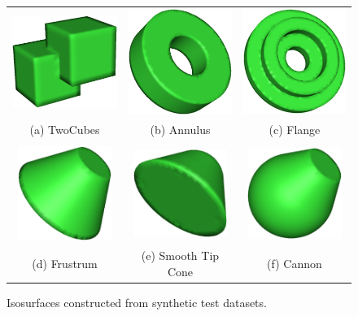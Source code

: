 \begin{figure}
\centering
\begin{tabular}{ccc}
\includegraphics[width=1.5in]{images/twocubes.eps} \qquad &
\qquad
\includegraphics[width=1.5in]{images/annulus.eps}
\qquad &
\includegraphics[width=1.5in]{images/flange.eps} \\

(a) TwoCubes & (b) Annulus & (c) Flange \\
\\
\includegraphics[width=1.2in]{images/frustrum.eps} \qquad &
\qquad
\includegraphics[width=1.2in]{images/smooth_tip_cone.eps} 
\qquad &
\qquad
\includegraphics[width=1.2in]{images/cannon_iso.eps} \\
(d) Frustrum & (e) Smooth Tip Cone & (f) Cannon
\end{tabular}
\caption{Isosurfaces constructed from synthetic test datasets.}
\label{fig:synthetic_data}
\end{figure}


